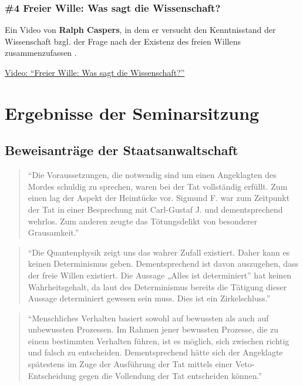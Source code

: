 \documentclass[
  a4paper,
]{report}
\begin{document}
\hypertarget{def-expert-ev4}{%
\subsection{\#4 Freier Wille: Was sagt die Wissenschaft?}\label{def-expert-ev4}}

Ein Video von \textbf{Ralph Caspers}, in dem er versucht den Kenntnisstand der Wissenschaft bzgl. der Frage nach der Existenz des freien Willens zusammenzufassen \citep{Caspers2021}.

\href{https://www.youtube.com/watch?v=45Iut50Cm_Q}{Video: ``Freier Wille: Was sagt die Wissenschaft?''}

\hypertarget{results}{%
\chapter{Ergebnisse der Seminarsitzung}\label{results}}

\hypertarget{pr-ev}{%
\section{\texorpdfstring{\textbf{Beweisanträge der Staatsanwaltschaft}}{Beweisanträge der Staatsanwaltschaft}}\label{pr-ev}}

\begin{quote}
``Die Voraussetzungen, die notwendig sind um einen Angeklagten des Mordes schuldig zu sprechen, waren bei der Tat vollständig erfüllt. Zum einen lag der Aspekt der Heimtücke vor. Sigmund F. war zum Zeitpunkt der Tat in einer Besprechung mit Carl-Gustaf J. und dementsprechend wehrlos. Zum anderen zeugte das Tötungsdelikt von besonderer Grausamkeit.''
\end{quote}

\begin{quote}
``Die Quantenphysik zeigt uns das wahrer Zufall existiert. Daher kann es keinen Determinismus geben. Dementsprechend ist davon auszugehen, dass der freie Willen existiert. Die Aussage „Alles ist determiniert'' hat keinen Wahrheitsgehalt, da laut des Determinismus bereits die Tätigung dieser Aussage determiniert gewesen sein muss. Dies ist ein Zirkelschluss.''
\end{quote}

\begin{quote}
``Menschliches Verhalten basiert sowohl auf bewussten als auch auf unbewussten Prozessen. Im Rahmen jener bewussten Prozesse, die zu einem bestimmten Verhalten führen, ist es möglich, sich zwischen richtig und falsch zu entscheiden. Dementsprechend hätte sich der Angeklagte spätestens im Zuge der Ausführung der Tat mittels einer Veto-Entscheidung gegen die Vollendung der Tat entscheiden können.''
\end{quote}
\end{document}
